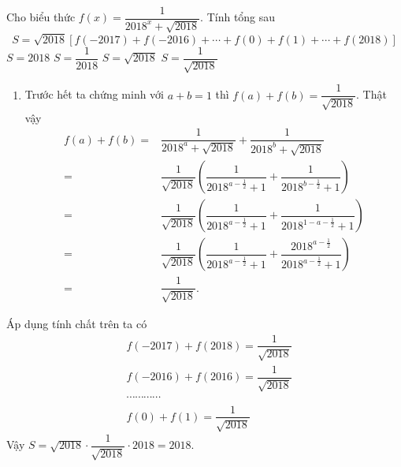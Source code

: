 	
\begin{ex}%
Cho biểu thức $f(x) =\dfrac{1}{2018^x +\sqrt{2018}}$. Tính tổng sau 
$$ S=\sqrt{2018}\left[f(-2017) +f(-2016)+\cdots + f(0) +f(1) +\cdots +f(2018)\right]$$
 \choice 
{\True $S=2018$}
{$S=\dfrac{1}{2018}$}
{$S=\sqrt{2018}$}
{$S=\dfrac{1}{\sqrt{2018}}$}
\loigiai
{
\begin{enumerate}
\item Trước hết ta chứng minh với $a+b=1$ thì $f(a)+f(b)=\dfrac{1}{\sqrt{2018}}$.
Thật vậy 
\begin{align*}
f(a) +f(b) =&\dfrac{1}{2018^a+\sqrt{2018}}+\dfrac{1}{2018^b+\sqrt{2018}}\\
=& \dfrac{1}{\sqrt{2018}}\left( \dfrac{1}{2018^{a-\frac{1}{2}} +1}+\dfrac{1}{2018^{b-\frac{1}{2}} +1}\right )\\
=& \dfrac{1}{\sqrt{2018}}\left( \dfrac{1}{2018^{a-\frac{1}{2}} +1}+\dfrac{1}{2018^{1-a-\frac{1}{2}} +1}\right )\\
=& \dfrac{1}{\sqrt{2018}}\left( \dfrac{1}{2018^{a-\frac{1}{2}} +1}+\dfrac{2018^{a-\frac{1}{2}}}{2018^{a-\frac{1}{2}} +1}\right )\\
=&\dfrac{1}{\sqrt{2018}}.
\end{align*}
\end{enumerate}
 Áp dụng tính chất trên ta có
  \begin{align*}
 &f(-2017) +f(2018) =\dfrac{1}{\sqrt{2018}}\\
 &f(-2016) +f(2016) =\dfrac{1}{\sqrt{2018}}\\
 &\cdots\cdots\cdots\cdots\\
 &f(0) +f(1) =\dfrac{1}{\sqrt{2018}}
 \end{align*}
Vậy $S=\sqrt{2018} \cdot \dfrac{1}{\sqrt{2018}}\cdot 2018 =2018$.
}
\end{ex}


